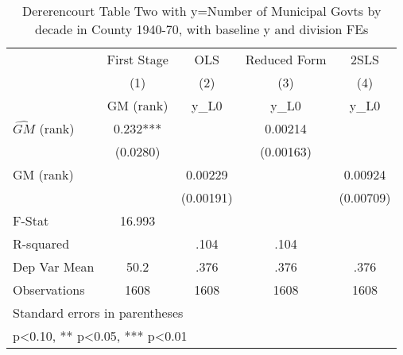 \begin{table}[htbp]\centering
\def\sym#1{\ifmmode^{#1}\else\(^{#1}\)\fi}
\caption{Dererencourt Table Two with y=Number of Municipal Govts by decade in County 1940-70, with baseline y and division FEs}
\begin{tabular}{l*{4}{c}}
\toprule
                    & First Stage   &         OLS   &Reduced Form   &        2SLS   \\
                    &\multicolumn{1}{c}{(1)}&\multicolumn{1}{c}{(2)}&\multicolumn{1}{c}{(3)}&\multicolumn{1}{c}{(4)}\\
                    &\multicolumn{1}{c}{GM  (rank)}&\multicolumn{1}{c}{y\_L0}&\multicolumn{1}{c}{y\_L0}&\multicolumn{1}{c}{y\_L0}\\
\midrule
$\hat{GM}$ (rank)   &       0.232***&               &     0.00214   &               \\
                    &    (0.0280)   &               &   (0.00163)   &               \\
\addlinespace
GM  (rank)          &               &     0.00229   &               &     0.00924   \\
                    &               &   (0.00191)   &               &   (0.00709)   \\
\midrule
F-Stat              &      16.993   &               &               &               \\
R-squared           &               &        .104   &        .104   &               \\
Dep Var Mean        &        50.2   &        .376   &        .376   &        .376   \\
Observations        &        1608   &        1608   &        1608   &        1608   \\
\bottomrule
\multicolumn{5}{l}{\footnotesize Standard errors in parentheses}\\
\multicolumn{5}{l}{\footnotesize * p<0.10, ** p<0.05, *** p<0.01}\\
\end{tabular}
\end{table}
